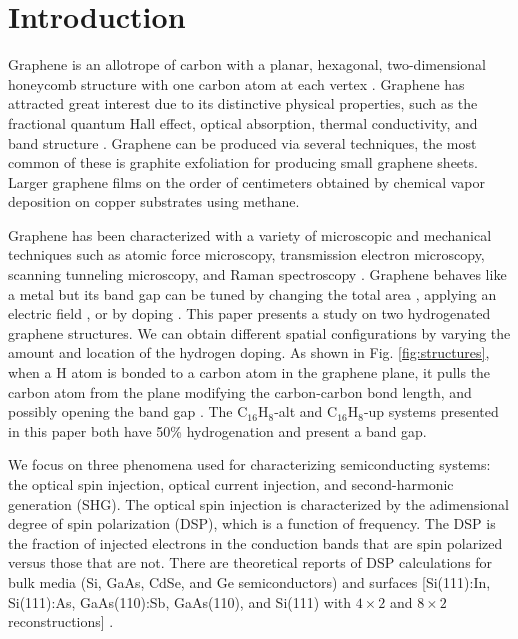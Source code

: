 \documentclass[pss]{wiley2sp} %
\begin{document}
\maketitle


\section{Introduction}\label{sec:intro}

Graphene is an allotrope of carbon with a planar, hexagonal, two-dimensional
honeycomb structure with one carbon atom at each vertex \cite{geim2007rise}.
Graphene has attracted great interest due to its distinctive physical
properties, such as the fractional quantum Hall effect, optical absorption,
thermal conductivity, and band structure \cite{geim2007rise,nair2008fine}.
Graphene can be produced via several techniques, the most common of these is
graphite exfoliation for producing small graphene sheets. Larger graphene
films on the order of centimeters obtained by chemical vapor deposition on
copper substrates using methane.

Graphene has been characterized with a variety of microscopic and mechanical
techniques such as atomic force microscopy, transmission electron microscopy,
scanning tunneling microscopy, and Raman spectroscopy
\cite{geim2007rise,rao2009graphene,boehm1994nomenclature,novoselov2005two}.
Graphene behaves like a metal \cite{geim2007rise} but its band gap can be
tuned by changing the total area \cite{han2007energy}, applying an electric
field \cite{zhang2009direct}, or by doping \cite{ohta2006controlling,%
elias2009control,guisinger2009exposure,samarakoon2010tunable}. This paper
presents a study on two hydrogenated graphene structures. We can obtain
different spatial configurations by varying the amount and location of the
hydrogen doping. As shown in Fig. \ref{fig:structures}, when a H atom is
bonded to a carbon atom in the graphene plane, it pulls the carbon atom from
the plane modifying the carbon-carbon bond length, and possibly opening the
band gap \cite{samarakoon2010tunable}. The C$_{16}$H$_{8}$-alt and
C$_{16}$H$_{8}$-up systems presented in this paper both have 50\%
hydrogenation and present a band gap.

We focus on three phenomena used for characterizing semiconducting systems:
the optical spin injection, optical current injection, and second-harmonic
generation (SHG). The optical spin injection is characterized by the
adimensional degree of spin polarization (DSP), which is a function of
frequency. The DSP is the fraction of injected electrons in the conduction
bands that are spin polarized versus those that are not. There are theoretical
reports of DSP calculations for bulk media (Si, GaAs, CdSe, and Ge
semiconductors) \cite{nastos2007full,cabellos2009stress,rioux2010optical} and
surfaces [Si(111):In, Si(111):As, GaAs(110):Sb, GaAs(110), and Si(111) with
$4\times2$ and $8\times2$ reconstructions]
\cite{mendoza2012optical,arzate2014optical}.
\end{document}
